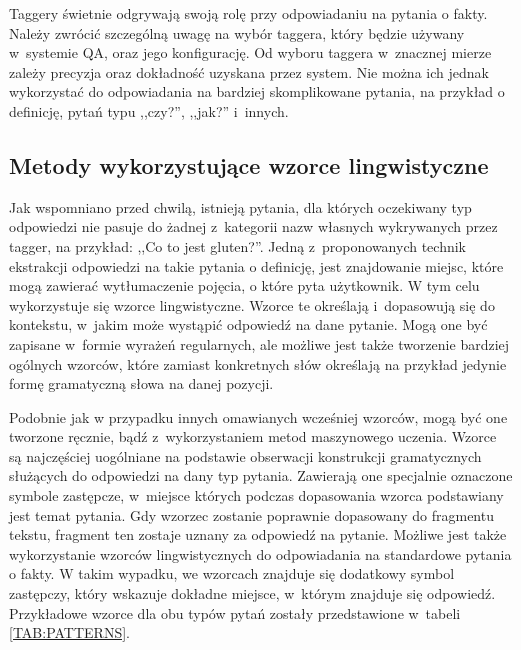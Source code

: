 \documentclass[a4paper, twoside, openright, 12pt]{report}
\begin{document}
            Taggery świetnie odgrywają swoją rolę przy odpowiadaniu na pytania o fakty. Należy zwrócić szczególną uwagę
            na wybór taggera, który będzie używany w~systemie QA, oraz jego konfigurację. Od wyboru taggera w~znacznej
            mierze zależy precyzja oraz dokładność uzyskana przez system\cite{NERQA}. Nie można ich jednak
            wykorzystać do odpowiadania na bardziej skomplikowane pytania, na przykład o definicję, pytań typu ,,czy?'',
            ,,jak?'' i~innych.

        \subsection{Metody wykorzystujące wzorce lingwistyczne}
            Jak wspomniano przed chwilą, istnieją pytania, dla których oczekiwany typ odpowiedzi nie pasuje do żadnej
            z~kategorii nazw własnych wykrywanych przez tagger, na przykład: ,,Co to jest gluten?''. Jedną z~proponowanych
            technik ekstrakcji odpowiedzi na takie pytania o definicję, jest znajdowanie miejsc, które mogą zawierać
            wytłumaczenie pojęcia, o które pyta użytkownik. W tym celu wykorzystuje się wzorce lingwistyczne. Wzorce te
            określają i~dopasowują się do kontekstu, w~jakim może wystąpić odpowiedź na dane pytanie. Mogą one być zapisane
            w~formie wyrażeń regularnych, ale możliwe jest także tworzenie bardziej ogólnych wzorców, które zamiast
            konkretnych słów określają na przykład jedynie formę gramatyczną słowa na danej pozycji.

            Podobnie jak w
            przypadku innych omawianych wcześniej wzorców, mogą być one tworzone ręcznie, bądź z~wykorzystaniem
            metod maszynowego uczenia. Wzorce są najczęściej uogólniane na podstawie obserwacji konstrukcji gramatycznych
            służących do odpowiedzi na dany typ pytania. Zawierają one specjalnie oznaczone symbole zastępcze, w~miejsce
            których podczas dopasowania wzorca podstawiany jest temat pytania. Gdy wzorzec zostanie poprawnie dopasowany
            do fragmentu tekstu, fragment ten zostaje uznany za odpowiedź na pytanie. Możliwe jest także wykorzystanie
            wzorców lingwistycznych do odpowiadania na standardowe pytania o fakty. W takim wypadku, we wzorcach znajduje
            się dodatkowy symbol zastępczy, który wskazuje dokładne miejsce, w~którym znajduje się odpowiedź. Przykładowe
            wzorce dla obu typów pytań zostały przedstawione w~tabeli \ref{TAB:PATTERNS}.
\end{document}
